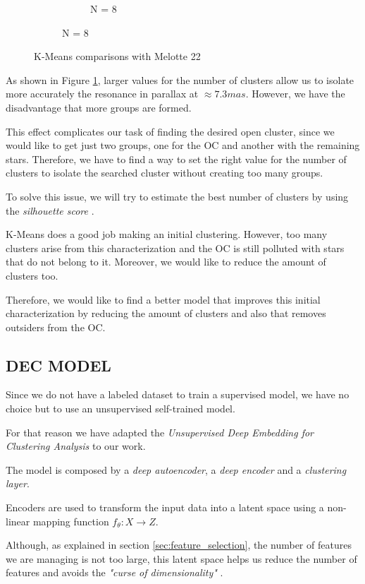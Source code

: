 \documentclass[11pt,a4paper,english,twocolumn]{article}
\begin{document}
\begin{figure}
\begin{subfigure}{\columnwidth}
\begin{subfigure}[t]{0.3\textwidth}
      \caption{N = 8}
    \end{subfigure}
  \end{subfigure}
  \caption{K-Means comparisons with Melotte 22}
  \label{fig:kmeans_comparisons_melotte_22}
\end{figure}

As shown in Figure \ref{fig:kmeans_comparisons_melotte_22}, larger values for the number of
clusters allow us to isolate more accurately the resonance in parallax at $\approx 7.3mas$.
However, we have the disadvantage that more groups are formed.

This effect complicates our task of finding the desired open cluster, since we would like
to get just two groups, one for the OC and another with the remaining stars.
Therefore, we have to find a way to set the right value for the number of clusters
to isolate the searched cluster without creating too many groups.

To solve this issue, we will try to estimate the best number of clusters by using the
\emph{silhouette score} \cite{rousseeuw1987silhouettes}.

K-Means does a good job making an initial clustering. However, too many clusters arise
from this characterization and the OC is still polluted with stars that do not belong to it.
Moreover, we would like to reduce the amount of clusters too.

Therefore, we would like to find a better model that improves this initial characterization
by reducing the amount of clusters and also that removes outsiders from the OC.

\subsection{DEC MODEL}

Since we do not have a labeled dataset to train a supervised model,
we have no choice but to use an unsupervised self-trained model.

For that reason we have adapted the \emph{Unsupervised Deep Embedding for Clustering Analysis}
to our work.

The model is composed by a \emph{deep autoencoder}, a \emph{deep encoder} and
a \emph{clustering layer}.

Encoders are used to transform the input data into a latent space
using a non-linear mapping function $f_{\theta} : X \rightarrow Z$.

Although, as explained in section \ref{sec:feature_selection},
the number of features we are managing is not too large,
this latent space helps us reduce the number of features
and avoids the \emph{"curse of dimensionality"} \cite{bellman1961curse}.
\end{document}
